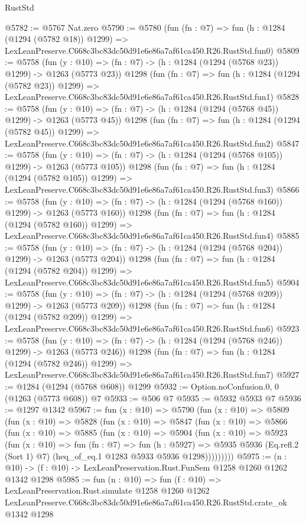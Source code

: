 \begin{lexlean}{RustStd}
\begin{coremodule}
@5782 := @5767 Nat.zero
@5790 := @5780
    (fun (fn : @7) =>
    fun (h : @1284 (@1294 (@5782 @18)) @1299) =>
    LexLeanPreserve.C668c3bc83dc50d91e6e86a7af61ca450.R26.RustStd.fun0)
@5809 := @5758
    (fun (y : @10) => (fn : @7) -> (h : @1284 (@1294 (@5768 @23)) @1299) -> @1263 (@5773 @23))
    @1298
    (fun (fn : @7) =>
    fun (h : @1284 (@1294 (@5782 @23)) @1299) =>
    LexLeanPreserve.C668c3bc83dc50d91e6e86a7af61ca450.R26.RustStd.fun1)
@5828 := @5758
    (fun (y : @10) => (fn : @7) -> (h : @1284 (@1294 (@5768 @45)) @1299) -> @1263 (@5773 @45))
    @1298
    (fun (fn : @7) =>
    fun (h : @1284 (@1294 (@5782 @45)) @1299) =>
    LexLeanPreserve.C668c3bc83dc50d91e6e86a7af61ca450.R26.RustStd.fun2)
@5847 := @5758
    (fun (y : @10) => (fn : @7) -> (h : @1284 (@1294 (@5768 @105)) @1299) -> @1263 (@5773 @105))
    @1298
    (fun (fn : @7) =>
    fun (h : @1284 (@1294 (@5782 @105)) @1299) =>
    LexLeanPreserve.C668c3bc83dc50d91e6e86a7af61ca450.R26.RustStd.fun3)
@5866 := @5758
    (fun (y : @10) => (fn : @7) -> (h : @1284 (@1294 (@5768 @160)) @1299) -> @1263 (@5773 @160))
    @1298
    (fun (fn : @7) =>
    fun (h : @1284 (@1294 (@5782 @160)) @1299) =>
    LexLeanPreserve.C668c3bc83dc50d91e6e86a7af61ca450.R26.RustStd.fun4)
@5885 := @5758
    (fun (y : @10) => (fn : @7) -> (h : @1284 (@1294 (@5768 @204)) @1299) -> @1263 (@5773 @204))
    @1298
    (fun (fn : @7) =>
    fun (h : @1284 (@1294 (@5782 @204)) @1299) =>
    LexLeanPreserve.C668c3bc83dc50d91e6e86a7af61ca450.R26.RustStd.fun5)
@5904 := @5758
    (fun (y : @10) => (fn : @7) -> (h : @1284 (@1294 (@5768 @209)) @1299) -> @1263 (@5773 @209))
    @1298
    (fun (fn : @7) =>
    fun (h : @1284 (@1294 (@5782 @209)) @1299) =>
    LexLeanPreserve.C668c3bc83dc50d91e6e86a7af61ca450.R26.RustStd.fun6)
@5923 := @5758
    (fun (y : @10) => (fn : @7) -> (h : @1284 (@1294 (@5768 @246)) @1299) -> @1263 (@5773 @246))
    @1298
    (fun (fn : @7) =>
    fun (h : @1284 (@1294 (@5782 @246)) @1299) =>
    LexLeanPreserve.C668c3bc83dc50d91e6e86a7af61ca450.R26.RustStd.fun7)
@5927 := @1284 (@1294 (@5768 @608)) @1299
@5932 := Option.noConfusion.{0, 0} (@1263 (@5773 @608)) @7
@5933 := @506 @7
@5935 := @5932 @5933 @7
@5936 := @1297 @1342
@5967 := fun (x : @10) =>
  @5790
    (fun (x : @10) =>
    @5809
      (fun (x : @10) =>
      @5828
        (fun (x : @10) =>
        @5847
          (fun (x : @10) =>
          @5866
            (fun (x : @10) =>
            @5885
              (fun (x : @10) =>
              @5904
                (fun (x : @10) =>
                @5923
                  (fun (x : @10) =>
                  fun (fn : @7) =>
                  fun (h : @5927) =>
                  @5935
                    @5936
                    (Eq.refl.{2} (Sort 1) @7)
                    (heq_of_eq.{1} @1283 @5933 @5936 @1298)))))))))
@5975 := (n : @10) -> (f : @10) -> LexLeanPreservation.Rust.FunSem @1258 @1260 @1262 @1342 @1298
@5985 := fun (n : @10) =>
  fun (f : @10) =>
  LexLeanPreservation.Rust.simulate
    @1258
    @1260
    @1262
    LexLeanPreserve.C668c3bc83dc50d91e6e86a7af61ca450.R26.RustStd.crate_ok
    @1342
    @1298
\end{coremodule}
\end{lexlean}
